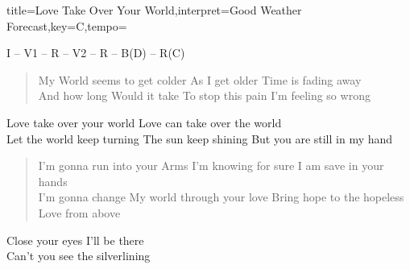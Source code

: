 \documentclass{leadsheet}
\begin{document}
\begin{song}{title={Love Take Over Your World},interpret={Good Weather Forecast},key={C},tempo={}}

\begin{schedule}
I -- V1 -- R -- V2 -- R -- B(D) -- R(C)
\end{schedule}

\begin{verse}
My World seems to get colder
As I get older
Time is fading away \\
And how long
Would it take
To stop this pain
I'm feeling so wrong
\end{verse}

\begin{chorus}
Love take over your world
Love can take over the world \\
Let the world keep turning
The sun keep shining
But you are still in my hand
\end{chorus}

\begin{verse}
I'm gonna run into your Arms
I'm knowing for sure
I am save in your hands \\
I'm gonna change
My world through your love
Bring hope to the hopeless
Love from above
\end{verse}

\begin{bridge}
Close your eyes
I'll be there \\
Can't you see the silverlining
\end{bridge}

\end{song}
\end{document}
